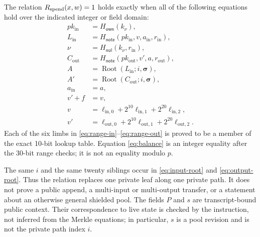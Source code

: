 \begin{definition}
\label{def:spend-relation}
The relation \(R_{\mathrm{spend}}(x,w)=1\) holds exactly when all of the following
equations hold over the indicated integer or field domain:
\begin{align}
 pk_{\mathrm{in}}
   &=H_{\mathsf{own}}(k_\nu),                                                   \label{eq:owner-key}\\
 L_{\mathrm{in}}
   &=H_{\mathsf{note}}(pk_{\mathrm{in}},v,a_{\mathrm{in}},r_{\mathrm{in}}),    \label{eq:input-note}\\
 \nu
   &=H_{\mathsf{nul}}(k_\nu,r_{\mathrm{in}}),                                  \label{eq:nullifier}\\
 C_{\mathrm{out}}
   &=H_{\mathsf{note}}(pk_{\mathrm{out}},v',a,r_{\mathrm{out}}),               \label{eq:output-note}\\
 A
   &=\operatorname{Root}(L_{\mathrm{in}};i,\boldsymbol\sigma),                  \label{eq:input-root}\\
 A'
   &=\operatorname{Root}(C_{\mathrm{out}};i,\boldsymbol\sigma),                \label{eq:output-root}\\
 a_{\mathrm{in}}&=a,                                                            \label{eq:asset-equality}\\
 v' + f&=v,                                                                      \label{eq:balance}\tag{integer}\\
 v&=\ell_{\mathrm{in},0}+2^{10}\ell_{\mathrm{in},1}
       +2^{20}\ell_{\mathrm{in},2},                                             \label{eq:range-in}\\
 v'&=\ell_{\mathrm{out},0}+2^{10}\ell_{\mathrm{out},1}
       +2^{20}\ell_{\mathrm{out},2}.                                            \label{eq:range-out}
\end{align}
Each of the six limbs in \eqref{eq:range-in}--\eqref{eq:range-out} is
proved to be a member of the exact 10-bit lookup table.  Equation
\eqref{eq:balance} is an integer equality after the 30-bit range checks; it
is not an equality modulo \(p\).
\end{definition}

The same \(i\) and the same twenty siblings occur in
\eqref{eq:input-root} and \eqref{eq:output-root}.  Thus the relation replaces
one private leaf along one private path.  It does not prove a public append,
a multi-input or multi-output transfer, or a statement about an otherwise
general shielded pool.  The fields \(P\) and \(s\) are transcript-bound public
context.  Their correspondence to live state is checked by the instruction,
not inferred from the Merkle equations; in particular, \(s\) is a pool
revision and is not the private path index \(i\).

